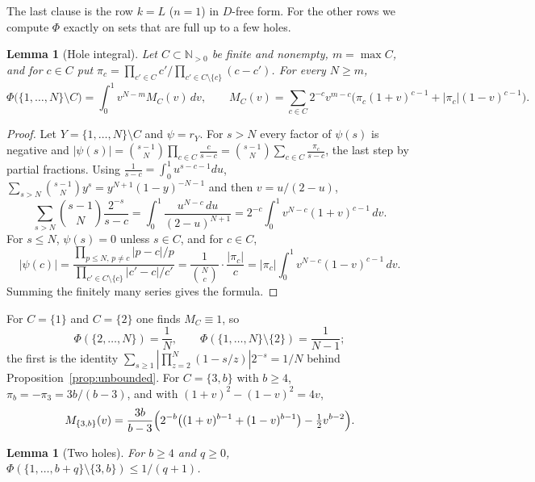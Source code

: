 \documentclass[11pt]{article}
\newtheorem{lemma}[theorem]{Lemma}
\newcommand{\N}{\mathbb N}
\begin{document}
The last clause is the row $k=L$ ($n=1$) in $D$-free form.  For the other
rows we compute $\Phi$ exactly on sets that are full up to a few holes.

\begin{lemma}[Hole integral]\label{lem:holeint}
Let $C\subset\N_{>0}$ be finite and nonempty, $m=\max C$, and for
$c\in C$ put $\pi_c=\prod_{c'\in C}c'\big/\prod_{c'\in C\setminus\{c\}}(c-c')$.
For every $N\ge m$,
\[
  \Phi\bigl(\{1,\ldots,N\}\setminus C\bigr)=\int_0^1v^{N-m}M_C(v)\,dv,
  \qquad
  M_C(v)=\sum_{c\in C}2^{-c}v^{m-c}\bigl(\pi_c(1+v)^{c-1}+|\pi_c|(1-v)^{c-1}\bigr).
\]
\end{lemma}

\begin{proof}
Let $Y=\{1,\ldots,N\}\setminus C$ and $\psi=r_Y$.  For $s>N$ every factor of
$\psi(s)$ is negative and
$|\psi(s)|=\binom{s-1}N\prod_{c\in C}\frac c{s-c}=\binom{s-1}N\sum_{c\in C}\frac{\pi_c}{s-c}$,
the last step by partial fractions.  Using $\frac1{s-c}=\int_0^1u^{s-c-1}du$,
$\sum_{s>N}\binom{s-1}N y^s=y^{N+1}(1-y)^{-N-1}$ and then $v=u/(2-u)$,
\[
  \sum_{s>N}\binom{s-1}N\frac{2^{-s}}{s-c}
  =\int_0^1\frac{u^{N-c}\,du}{(2-u)^{N+1}}
  =2^{-c}\int_0^1v^{N-c}(1+v)^{c-1}\,dv .
\]
For $s\le N$, $\psi(s)=0$ unless $s\in C$, and for $c\in C$,
\[
  |\psi(c)|=\frac{\prod_{p\le N,\,p\ne c}|p-c|/p}{\prod_{c'\in C\setminus\{c\}}|c'-c|/c'}
  =\frac1{\binom Nc}\cdot\frac{|\pi_c|}c
  =|\pi_c|\int_0^1v^{N-c}(1-v)^{c-1}\,dv .
\]
Summing the finitely many series gives the formula.
\end{proof}

For $C=\{1\}$ and $C=\{2\}$ one finds $M_C\equiv1$, so
\begin{equation}\label{eq:onehole}
  \Phi(\{2,\ldots,N\})=\frac1N,\qquad
  \Phi(\{1,\ldots,N\}\setminus\{2\})=\frac1{N-1};
\end{equation}
the first is the identity
$\sum_{s\ge1}|\prod_{z=2}^N(1-s/z)|2^{-s}=1/N$ behind
Proposition~\ref{prop:unbounded}.  For $C=\{3,b\}$ with $b\ge4$,
$\pi_b=-\pi_3=3b/(b-3)$, and with $(1+v)^2-(1-v)^2=4v$,
\begin{equation}\label{eq:twohole}
  M_{\{3,b\}}(v)=\frac{3b}{b-3}\Bigl(2^{-b}\bigl((1+v)^{b-1}+(1-v)^{b-1}\bigr)
                   -\tfrac12v^{b-2}\Bigr).
\end{equation}

\begin{lemma}[Two holes]\label{lem:twohole}
For $b\ge4$ and $q\ge0$,
$\Phi(\{1,\ldots,b+q\}\setminus\{3,b\})\le1/(q+1)$.
\end{lemma}
\end{document}
